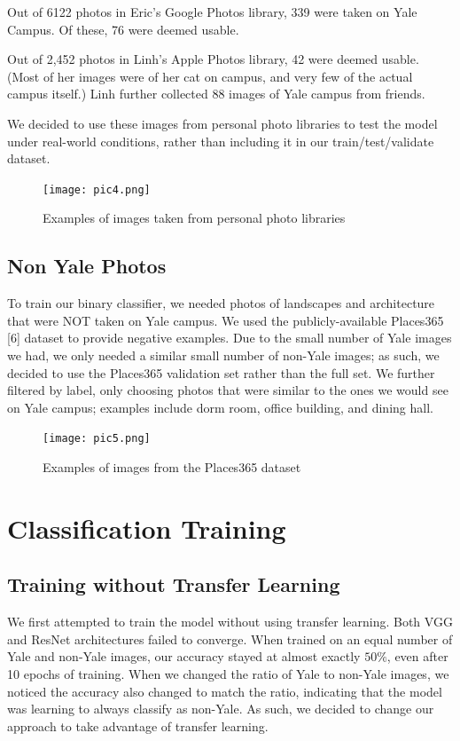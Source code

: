 \documentclass[letterpaper]{article} %
\begin{document}
Out of 6122 photos in Eric’s Google Photos library, 339 were taken on Yale Campus. Of these, 76 were deemed usable.

Out of 2,452 photos in Linh’s Apple Photos library, 42 were deemed usable. (Most of her images were of her cat on campus, and very few of the actual campus itself.) Linh further collected 88 images of Yale campus from friends.

We decided to use these images from personal photo libraries to test the model under real-world conditions, rather than including it in our train/test/validate dataset. 

\begin{figure}
    \centering
    \texttt{[image: pic4.png]}
    \caption{Examples of images taken from personal photo libraries}
    \label{fig:enter-label}
\end{figure}



\subsection{Non Yale Photos}
To train our binary classifier, we needed photos of landscapes and architecture that were NOT taken on Yale campus. We used the publicly-available Places365 [6] dataset to provide negative examples. Due to the small number of Yale images we had, we only needed a similar small number of non-Yale images; as such, we decided to use the Places365 validation set rather than the full set. We further filtered by label, only choosing photos that were similar to the ones we would see on Yale campus; examples include dorm room, office building, and dining hall. 

\begin{figure}
    \centering
    \texttt{[image: pic5.png]}
    \caption{Examples of images from the Places365 dataset}
    \label{fig:enter-label}
\end{figure}

\section{Classification Training}
\subsection{Training without Transfer Learning}
We first attempted to train the model without using transfer learning. Both VGG and ResNet architectures failed to converge. When trained on an equal number of Yale and non-Yale images, our accuracy stayed at almost exactly $50\%$, even after 10 epochs of training. When we changed the ratio of Yale to non-Yale images, we noticed the accuracy also changed to match the ratio, indicating that the model was learning to always classify as non-Yale. As such, we decided to change our approach to take advantage of transfer learning.
\end{document}
